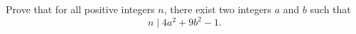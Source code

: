 Prove that for all positive integers $n$, there exist two integers $a$ and $b$ such that
$$n\mid 4a^2+9b^2-1.$$
